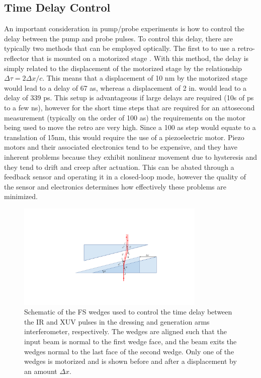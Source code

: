 \subsection{Time Delay Control}
\label{sec:delay_wedges}

An important consideration in pump/probe experiments is how to control the delay between the pump and probe pulses.  To control this delay, there are typically two methods that can be employed optically.  The first to to use a retro-reflector that is mounted on a motorized stage \cite{jagerAttosecondTransientAbsorption2018, jagerAttosecondTransientAbsorption2017, bellTransientAbsorptionSpectroscopy2013, jiangChargeCarrierDynamics2015, borjaElectronDynamicsSolids2016, chengAttoseondTransientAbsorption2015}.  With this method, the delay is simply related to the displacement of the motorized stage by the relationship $\Delta\tau = 2\Delta x/c$.  This means that a displacement of 10 nm by the motorized stage would lead to a delay of 67 as, whereas a displacement of 2 in. would lead to a delay of 339 ps. This setup is advantageous if large delays are required (10s of ps to a few ns), however for the short time steps that are required for an attosecond measurement (typically on the order of 100 as) the requirements on the motor being used to move the retro are very high.  Since a 100 as step would equate to a translation of 15nm, this would require the use of a piezoelectric motor.  Piezo motors and their associated electronics tend to be expensive, and they have inherent problems because they exhibit nonlinear movement due to hysteresis and they tend to drift and creep after actuation.  This can be abated through a feedback sensor and operating it in a closed-loop mode, however the quality of the sensor and electronics determines how effectively these problems are minimized.

\begin{figure}
	\centering
	\includegraphics[width=0.8\textwidth]{figures/Beamline/wedge_delay_calibration.pdf}
	\caption[Schematic of FS wedges used for delay control]{Schematic of the FS wedges used to control the time delay between the IR and XUV pulses in the dressing and generation arms interferometer, respectively. The wedges are aligned such that the input beam is normal to the first wedge face, and the beam exits the wedges normal to the last face of the second wedge.  Only one of the wedges is motorized and is shown before and after a displacement by an amount $\Delta x$.}
	\label{fig:wedges}
\end{figure}


